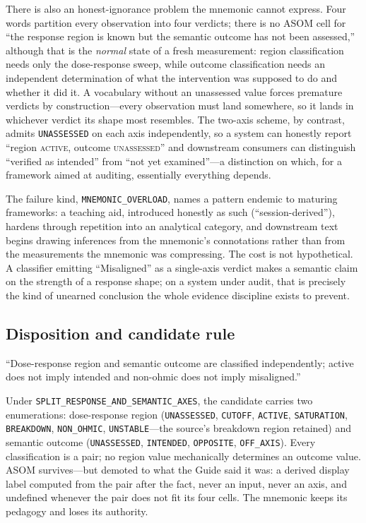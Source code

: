 There is also an honest-ignorance problem the mnemonic cannot express. Four
words partition every observation into four verdicts; there is no ASOM cell
for ``the response region is known but the semantic outcome has not been
assessed,'' although that is the \emph{normal} state of a fresh measurement:
region classification needs only the dose-response sweep, while outcome
classification needs an independent determination of what the intervention
was supposed to do and whether it did it. A vocabulary without an
unassessed value forces premature verdicts by construction---every
observation must land somewhere, so it lands in whichever verdict its shape
most resembles. The two-axis scheme, by contrast, admits
\texttt{UNASSESSED} on each axis independently, so a system can honestly
report ``region \textsc{active}, outcome \textsc{unassessed}'' and
downstream consumers can distinguish ``verified as intended'' from ``not
yet examined''---a distinction on which, for a framework aimed at auditing,
essentially everything depends.

The failure kind, \texttt{MNEMONIC\_OVERLOAD}, names a pattern endemic to
maturing frameworks: a teaching aid, introduced honestly as such
(``session-derived''), hardens through repetition into an analytical
category, and downstream text begins drawing inferences from the mnemonic's
connotations rather than from the measurements the mnemonic was compressing.
The cost is not hypothetical. A classifier emitting ``Misaligned'' as a
single-axis verdict makes a semantic claim on the strength of a response
shape; on a system under audit, that is precisely the kind of unearned
conclusion the whole evidence discipline exists to prevent.

\subsection{Disposition and candidate rule}

\begin{ruleenv}\label{ch04:rule:asom}
``Dose-response region and semantic outcome are classified independently;
active does not imply intended and non-ohmic does not imply misaligned.''
\end{ruleenv}

Under \texttt{SPLIT\_RESPONSE\_AND\_SEMANTIC\_AXES}, the candidate carries
two enumerations: dose-response region (\texttt{UNASSESSED},
\texttt{CUTOFF}, \texttt{ACTIVE}, \texttt{SATURATION}, \texttt{BREAKDOWN},
\texttt{NON\_OHMIC}, \texttt{UNSTABLE}---the source's breakdown region
retained) and semantic outcome (\texttt{UNASSESSED}, \texttt{INTENDED},
\texttt{OPPOSITE}, \texttt{OFF\_AXIS}). Every classification is a pair; no
region value mechanically determines an outcome value. ASOM survives---but
demoted to what the Guide said it was: a derived display label computed from
the pair after the fact, never an input, never an axis, and undefined
whenever the pair does not fit its four cells. The mnemonic keeps its
pedagogy and loses its authority.


